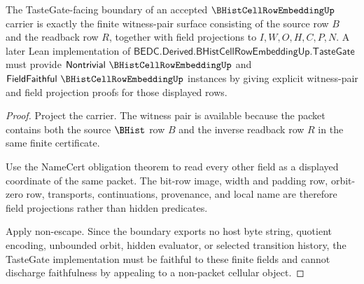 \begin{theorem}
\label{thm:bhist-cell-row-embedding-tastegate-boundary}
The TasteGate-facing boundary of an accepted $\BHistCellRowEmbeddingUp$ carrier is exactly the finite witness-pair surface consisting of the source row $B$ and the readback row $R$, together with field projections to $I,W,O,H,C,P,N$. A later Lean implementation of $\mathsf{BEDC.Derived.BHistCellRowEmbeddingUp.TasteGate}$ must provide $\mathsf{Nontrivial}\ \BHistCellRowEmbeddingUp$ and $\mathsf{FieldFaithful}\ \BHistCellRowEmbeddingUp$ instances by giving explicit witness-pair and field projection proofs for those displayed rows.
\end{theorem}
\begin{proof}
Project the carrier. The witness pair is available because the packet contains both the source $\BHist$ row $B$ and the inverse readback row $R$ in the same finite certificate.

Use the NameCert obligation theorem to read every other field as a displayed coordinate of the same packet. The bit-row image, width and padding row, orbit-zero row, transports, continuations, provenance, and local name are therefore field projections rather than hidden predicates.

Apply non-escape. Since the boundary exports no host byte string, quotient encoding, unbounded orbit, hidden evaluator, or selected transition history, the TasteGate implementation must be faithful to these finite fields and cannot discharge faithfulness by appealing to a non-packet cellular object.
\end{proof}


\begin{closurestatus}{\BHistCellRowEmbeddingUp}
  \theoryclosure{\obligationClosure}
  \formalstatus{\unformalizedV}
\end{closurestatus}
